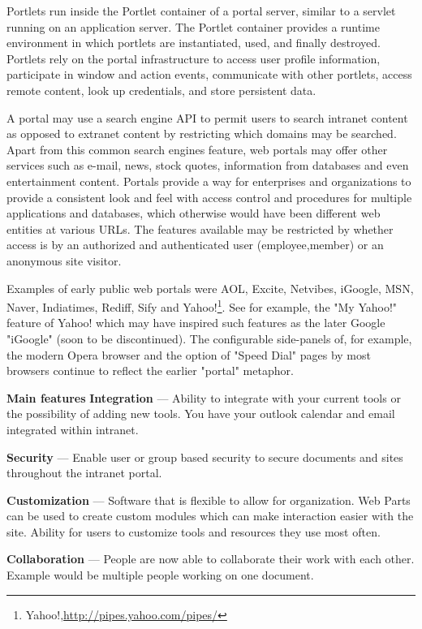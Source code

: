 		Portlets run inside the Portlet container of a portal server, similar to a servlet running on an application server. The Portlet container provides a runtime environment in which portlets are instantiated, used, and finally destroyed. Portlets rely on the portal infrastructure to access user profile information, participate in window and action events, communicate with other portlets, access remote content, look up credentials, and store persistent data.

		A portal may use a search engine API to permit users to search intranet content as opposed to extranet content by restricting which domains may be searched. Apart from this common search engines feature, web portals may offer other services such as e-mail, news, stock quotes, information from databases and even entertainment content. Portals provide a way for enterprises and organizations to provide a consistent look and feel with access control and procedures for multiple applications and databases, which otherwise would have been different web entities at various URLs. The features available may be restricted by whether access is by an authorized and authenticated user (employee,member) or an anonymous site visitor.

		Examples of early public web portals were AOL, Excite, Netvibes, iGoogle, MSN, Naver, Indiatimes, Rediff, Sify and Yahoo!\footnote{Yahoo!,\url{http://pipes.yahoo.com/pipes/}}. See for example, the "My Yahoo!" feature of Yahoo! which may have inspired such features as the later Google "iGoogle" (soon to be discontinued). The configurable side-panels of, for example, the modern Opera browser and the option of "Speed Dial" pages by most browsers continue to reflect the earlier "portal" metaphor.

		\textbf{Main features}
		\textbf{Integration} — Ability to integrate with your current tools or the possibility of adding new tools. You have your outlook calendar and email integrated within intranet.

        \textbf{Security} — Enable user or group based security to secure documents and sites throughout the intranet portal.

		\textbf{Customization} — Software that is flexible to allow for organization. Web Parts can be used to create custom modules which can make interaction easier with the site. Ability for users to customize tools and resources they use most often.

		\textbf{Collaboration} — People are now able to collaborate their work with each other. Example would be multiple people working on one document.

